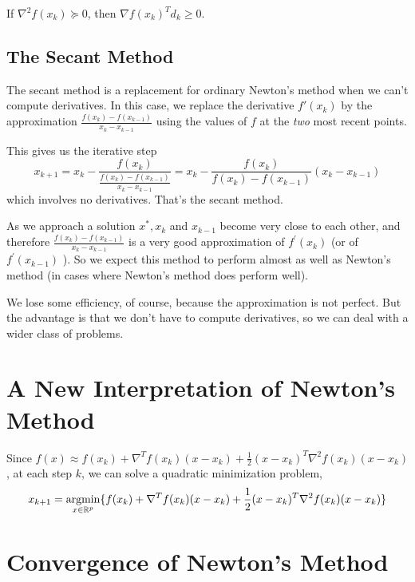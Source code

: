 \documentclass[11pt]{elegantbook}
\newcommand{\argmin}{\operatornamewithlimits{argmin}}
\begin{document}
If $\nabla^2 f(x_k)\succeq 0$, then $\nabla f(x_k)^Td_k\geq 0$.

\subsection{The Secant Method}
The secant method is a replacement for ordinary Newton's method when we can't compute derivatives. In this case, we replace the derivative $f'(x_k)$ by the approximation $\frac{f(x_k)-f(x_{k-1})}{x_k-x_{k-1}}$ using the values of $f$ at the \textit{two} most recent points.

This gives us the iterative step
$$
x_{k+1}=x_k-\frac{f\left(x_k\right)}{\frac{f\left(x_k\right)-f\left(x_{k-1}\right)}{x_k-x_{k-1}}}=x_k-\frac{f\left(x_k\right)}{f\left(x_k\right)-f\left(x_{k-1}\right)}\left(x_k-x_{k-1}\right)
$$
which involves no derivatives. That's the secant method.

As we approach a solution $x^*, x_k$ and $x_{k-1}$ become very close to each other, and therefore $\frac{f\left(x_k\right)-f\left(x_{k-1}\right)}{x_k-x_{k-1}}$ is a very good approximation of $f^{\prime}\left(x_k\right)$ (or of $f^{\prime}\left(x_{k-1}\right)$ ). So we expect this method to perform almost as well as Newton's method (in cases where Newton's method does perform well).

We lose some efficiency, of course, because the approximation is not perfect. But the advantage is that we don't have to compute derivatives, so we can deal with a wider class of problems.



\section{A New Interpretation of Newton's Method}
Since $f(x)\approx f(x_k)+\nabla^T f(x_k)(x-x_k)+\frac{1}{2}(x-x_k)^T \nabla^2 f(x_k) (x-x_k)$, at each step $k$, we can solve a quadratic minimization problem,
\begin{equation}
    \begin{aligned}
        x_{k+1}=\argmin_{x\in \mathbb{R}^p}\{f(x_k)+\nabla^T f(x_k)(x-x_k)+\frac{1}{2}(x-x_k)^T \nabla^2 f(x_k) (x-x_k)\}
    \end{aligned}
    \nonumber
\end{equation}

\section{Convergence of Newton's Method}
\end{document}
